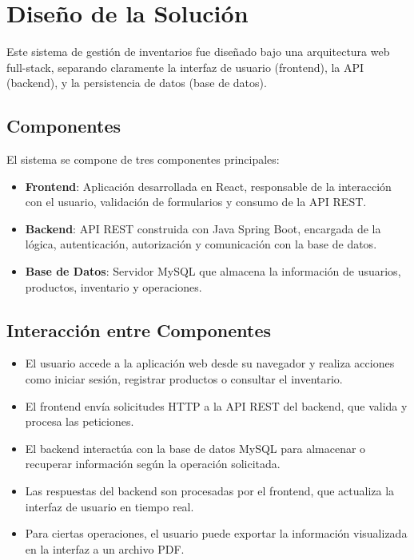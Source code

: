 \section{Diseño de la Solución}

Este sistema de gestión de inventarios fue diseñado bajo una arquitectura web full-stack, separando claramente la interfaz de usuario (frontend), la API (backend), y la persistencia de datos (base de datos).

\subsection{Componentes}

El sistema se compone de tres componentes principales:

\begin{itemize}
    \item \textbf{Frontend}: Aplicación desarrollada en React, responsable de la interacción con el usuario, validación de formularios y consumo de la API REST.
    \item \textbf{Backend}: API REST construida con Java Spring Boot, encargada de la lógica, autenticación, autorización y comunicación con la base de datos.
    \item \textbf{Base de Datos}: Servidor MySQL que almacena la información de usuarios, productos, inventario y operaciones.
\end{itemize}

\subsection{Interacción entre Componentes}

\begin{itemize}
    \item El usuario accede a la aplicación web desde su navegador y realiza acciones como iniciar sesión, registrar productos o consultar el inventario.
    \item El frontend envía solicitudes HTTP a la API REST del backend, que valida y procesa las peticiones.
    \item El backend interactúa con la base de datos MySQL para almacenar o recuperar información según la operación solicitada.
    \item Las respuestas del backend son procesadas por el frontend, que actualiza la interfaz de usuario en tiempo real.
    \item Para ciertas operaciones, el usuario puede exportar la información visualizada en la interfaz a un archivo PDF.
\end{itemize}

